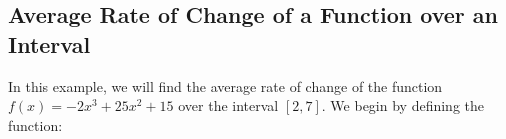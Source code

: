 \begin{maplegroup}
\begin{mapleinput}
\end{mapleinput}
\mapleresult
\begin{maplelatex}
\end{maplelatex}
\end{maplegroup}
\begin{maplegroup}
\begin{mapleinput}
\end{mapleinput}
\mapleresult
\begin{maplelatex}
\end{maplelatex}
\end{maplegroup}
\begin{maplegroup}
\begin{mapleinput}
\end{mapleinput}
\mapleresult
\begin{maplelatex}
\end{maplelatex}
\mapleresult
\begin{maplelatex}
\end{maplelatex}
\end{maplegroup}
\begin{maplegroup}
\begin{mapleinput}
\end{mapleinput}
\mapleresult
{}
\end{maplegroup}


\subsection{Average Rate of Change of a Function over an Interval}

In this example, we will find the average rate of change of the function $f(x) = -2x^3 + 25x^2 + 15$ over the interval $[2,7]$. We begin by defining the function:

